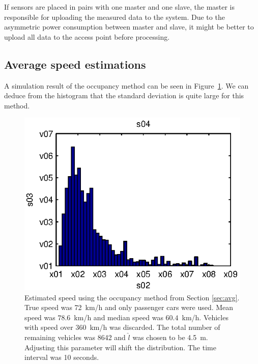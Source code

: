 If sensors are placed in pairs with one master and one slave, the master is responsible for uploading the measured data to the system. Due to the asymmetric power consumption between master and slave, it might be better to upload all data to the access point before processing.

\subsection{Average speed estimations}\label{sec:avg_per}

A simulation result of the occupancy method can be seen in \mbox{Figure \ref{fig:occSpeedHist}}. We can deduce from the histogram that the standard deviation is quite large for this method.

\begin{figure}
 \centering
 \begin{minipage}{0.45\linewidth}
 \centering
 
 \includegraphics[width=1\linewidth]{images/occupancSpeedHist}
 \caption[Estimated speed using the occupancy method.]{Estimated speed using the occupancy method from Section \ref{sec:avg}. True speed was \mbox{72~km/h} and only passenger cars were used. Mean speed was \mbox{$78.6$~km/h} and median speed was \mbox{$60.4$ km/h}. Vehicles with speed over \mbox{360~km/h} was discarded. The total number of remaining vehicles was 8642 and $\hat{l}$ was chosen to be \mbox{4.5~m}. Adjusting this parameter will shift the distribution. The time interval was 10 seconds.}
 \label{fig:occSpeedHist}

\end{minipage}
\end{figure}
